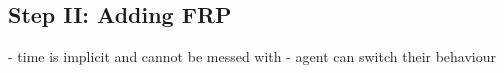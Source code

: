 \subsection{Step II: Adding FRP}

- time is implicit and cannot be messed with
- agent can switch their behaviour